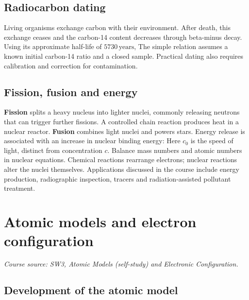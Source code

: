 \documentclass[a4paper,10pt]{article}
\newcommand{\source}[1]{{\small\textit{Course source: #1.}\par}}
\newcommand{\chemunit}[1]{\,\mathrm{#1}}
\newcommand{\chapterbreak}{\clearpage}
\begin{document}
\subsection{Radiocarbon dating}
Living organisms exchange carbon with their environment. After death, this
exchange ceases and the carbon-14 content decreases through beta-minus decay.
Using its approximate half-life of $5730\chemunit{years}$,
The simple relation assumes a known initial carbon-14 ratio and a closed sample.
Practical dating also requires calibration and correction for contamination.

\subsection{Fission, fusion and energy}
\textbf{Fission} splits a heavy nucleus into lighter nuclei, commonly releasing
neutrons that can trigger further fissions. A controlled chain reaction produces
heat in a nuclear reactor. \textbf{Fusion} combines light nuclei and powers stars.
Energy release is associated with an increase in nuclear binding energy:
Here $c_0$ is the speed of light, distinct from concentration $c$.
Balance mass numbers and atomic numbers in nuclear equations. Chemical reactions
rearrange electrons; nuclear reactions alter the nuclei themselves.
Applications discussed in the course include energy production, radiographic
inspection, tracers and radiation-assisted pollutant treatment.

\chapterbreak
\section{Atomic models and electron configuration}
\label{sec:orbitals}
\source{SW3, Atomic Models (self-study) and Electronic Configuration}

\subsection{Development of the atomic model}
\end{document}
